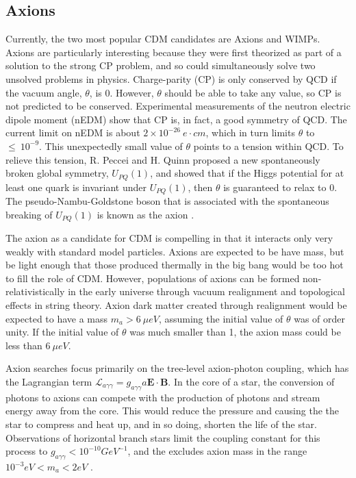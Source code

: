 \subsection{Axions}
Currently, the two most popular CDM candidates are Axions and WIMPs. Axions are particularly interesting because they were first theorized as part of a solution to the strong CP problem, and so could simultaneously solve two unsolved problems in physics. Charge-parity (CP) is only conserved by QCD if the vacuum angle, $\theta$, is 0. However,  $\theta$ should be able to take any value, so CP is not predicted to be conserved. Experimental measurements of the neutron electric dipole moment (nEDM) show that CP is, in fact, a good symmetry of QCD. The current limit on nEDM is about $2 \times 10^{-26} \ e \cdot cm$, which in turn limits $\theta$ to $\leq \ 10^{-9}$\cite{nedm,axion_DM}. This unexpectedly small value of $\theta$ points to a tension within QCD. To relieve this tension, R. Peccei and H. Quinn proposed a new spontaneously broken global symmetry, $U_{PQ}(1)$, and showed that if the Higgs potential for at least one quark is invariant under $U_{PQ}(1)$, then $\theta$ is guaranteed to relax to 0. The pseudo-Nambu-Goldstone boson that is associated with the spontaneous breaking of $U_{PQ}(1)$ is known as the axion \cite{peccei_quinn, axion_DM}.

The axion as a candidate for CDM is compelling in that it interacts only very weakly with standard model particles. Axions are expected to be have mass, but be light enough that those produced thermally in the big bang would be too hot to fill the role of CDM. However, populations of axions can be formed non-relativistically in the early universe through vacuum realignment and topological effects in string theory. Axion dark matter created through realignment would be expected to have a mass $m_{a} >6 \ \mu eV$, assuming the initial value of $\theta$ was of order unity. If the initial value of $\theta$ was much smaller than 1, the axion mass could be less than $6 \ \mu eV$\cite{axion_DM}.

Axion searches focus primarily on the tree-level axion-photon coupling, which has the Lagrangian term $\mathcal{L}_{a \gamma \gamma}=g_{a \gamma \gamma}a\mathbf{E \cdot B}$. In the core of a star, the conversion of photons to axions can compete with the production of photons and stream energy away from the core. This would reduce the pressure and causing the the star to compress and heat up, and in so doing, shorten the life of the star. Observations of horizontal branch stars limit the coupling constant for this process to  $g_{a \gamma \gamma}   <10^{-10} GeV^{-1}$, and the excludes axion mass in the range $10^{-3} eV < m_{a} < 2 eV$ \cite{axion_DM, axion_photon}.

